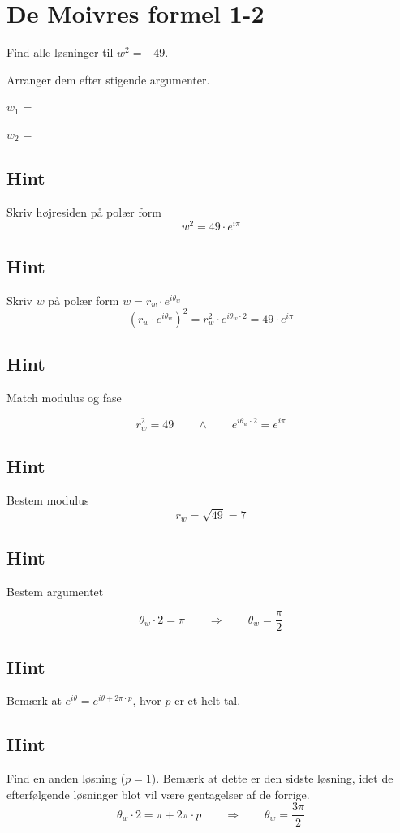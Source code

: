 \documentclass{article}
\newenvironment{exercise}[1]{\newpage\section{#1}}{}
\newcommand{\answerbox}[1]{\fbox{$#1$}}
\newcommand{\hint}{\subsection*{Hint}}
\begin{document}
\newpage

\begin{exercise}{De Moivres formel 1-2}

Find alle løsninger til $w^2=-49$. 

Arranger dem efter stigende argumenter.

$w_1$ = \answerbox{7 \cdot e^{i \frac{\pi}{2}}}		

$w_2$ = \answerbox{7 \cdot e^{i \frac{3 \pi}{2}}}		


\hint 

Skriv højresiden på polær form
\[
w^2 = 49 \cdot e^{i \pi}
\]


\hint

Skriv $w$ på polær form $w = r_w \cdot e^{i \theta_w}$
\[
\left(r_w \cdot e^{i \theta_w}\right)^2 = r_w^2 \cdot e^{i \theta_w \cdot 2} = 49 \cdot e^{i \pi}
\]

\hint 
Match modulus og fase

\[
r_w^2 = 49 \qquad \wedge \qquad e^{i \theta_w \cdot 2} = e^{i \pi}
\]

\hint

Bestem modulus
\[
r_w  =  \sqrt{49} = 7
\]

\hint

Bestem argumentet

\[
\theta_w \cdot 2 = \pi \qquad \Rightarrow \qquad  \theta_w = \frac{\pi}{2}
\]

\hint

Bemærk at $e^{i \theta} = e^{i \theta + 2 \pi \cdot p}$, hvor $p$ er et helt tal.

\hint

Find en anden løsning ($p=1$). 
Bemærk at dette er den sidste løsning, idet de efterfølgende 
løsninger blot vil være gentagelser af de forrige. 
\[
\theta_w \cdot 2 = \pi  + 2 \pi \cdot p \qquad \Rightarrow \qquad  \theta_w = \frac{3 \pi}{2}
\]


\end{exercise}

\newpage
\end{document}
